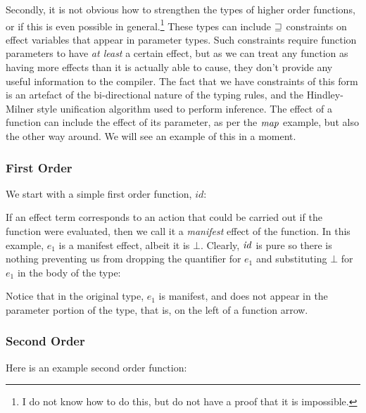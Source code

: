 Secondly, it is not obvious how to strengthen the types of higher order functions, or if this is even possible in general.\footnote{I do not know how to do this, but do not have a proof that it is impossible.} These types can include $\sqsupseteq$ constraints on effect variables that appear in parameter types. Such constraints require function parameters to have \emph{at least} a certain effect, but as we can treat any function as having more effects than it is actually able to cause, they don't provide any useful information to the compiler. The fact that we have constraints of this form is an artefact of the bi-directional nature of the typing rules, and the Hindley-Milner style unification algorithm used to perform inference. The effect of a function can include the effect of its parameter, as per the $\operatorname{\mathit{map}}$ example, but also the other way around. We will see an example of this in a moment.


\subsubsection{First Order}
We start with a simple first order function, $id$:


If an effect term corresponds to an action that could be carried out if the function were evaluated, then we call it a \emph{manifest} effect of the function. In this example, $e_1$ is a manifest effect, albeit it is $\bot$. Clearly, $\operatorname{\mathit{id}}$ is pure so there is nothing preventing us from dropping the quantifier for $e_1$ and substituting $\bot$ for $e_1$ in the body of the type:


Notice that in the original type, $e_1$ is manifest, and does not appear in the parameter portion of the type, that is, on the left of a function arrow. 


\subsubsection{Second Order}
Here is an example second order function:


